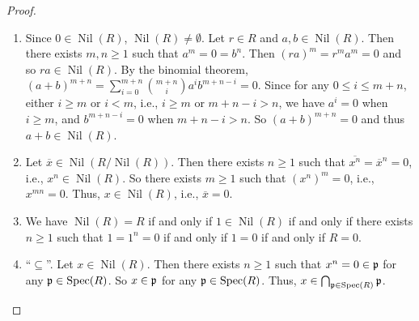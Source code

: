 \begin{proof}
    \begin{enumerate}
        \item Since $0 \in \operatorname{Nil}(R)$, $\operatorname{Nil}(R) \neq \emptyset$. Let $r \in R$ and $a,b \in \operatorname{Nil}(R)$. Then there exists $m,n \geq 1$ such that $a^m = 0 = b^n$. Then $(ra)^m = r^ma^m = 0$ and so $ra \in \operatorname{Nil}(R)$. By the binomial theorem, $(a+b)^{m+n} = \sum_{i=0}^{m+n} \binom {m+n} i a^i b^{m+n-i} = 0$. Since for any $0 \leq i \leq m+n$, either $i \geq m$ or $i < m$, i.e., $i \geq m$ or $m+n-i > n$, we have $a^i = 0$ when $i \geq m$, and $b^{m+n-i} = 0 $ when $m + n-i > n$. So $(a+b)^{m+n} = 0$ and thus $a+b \in \operatorname{Nil}(R)$.
        \item Let $\overbar x \in \operatorname{Nil}(R/\operatorname{Nil}(R))$. Then there exists $n \geq 1$ such that $\overbar {x^n} = \overbar x^n = 0$, i.e., $x^n \in \operatorname{Nil}(R)$. So there exists $m \geq 1$ such that $(x^n)^m = 0$, i.e., $x^{mn} = 0$. Thus, $x \in \operatorname{Nil}(R)$, i.e., $\overbar x = 0$.
        \item  We have $\operatorname{Nil}(R) = R$ if and only if $1 \in \operatorname{Nil}(R)$ if and only if there exists $n \geq 1$ such that $1 = 1^n = 0$ if and only if $1 = 0$ if and only if $R = 0$.
        \item ``$\subseteq$''. Let $x \in \operatorname{Nil}(R)$. Then there exists $n \geq 1$ such that $x^n = 0 \in \mathfrak{p}$ for any $\mathfrak{p} \in \operatorname{Spec}(R)$. So $x \in \mathfrak{p}$ for any $\mathfrak{p} \in \operatorname{Spec}(R)$. Thus, $x \in \bigcap_{\mathfrak{p} \in \operatorname{Spec}(R)} \mathfrak{p}$. \\

\end{enumerate}
\end{proof}
